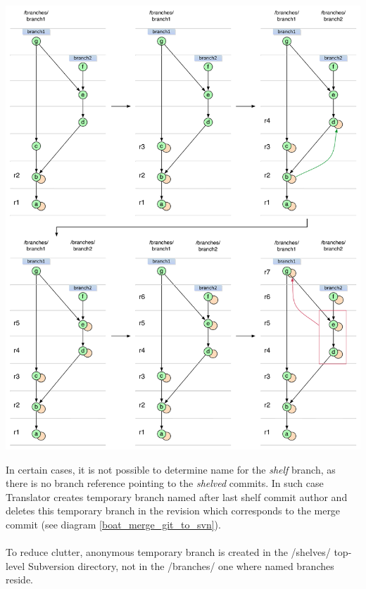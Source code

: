 \begin{center}
\includegraphics[width=\textwidth]{img/diagrams/boat_merge_shelve_is_normal_branch_git_to_svn.pdf}%
\label{boat_merge_shelve_is_normal_branch_git_to_svn}%
\end{center}

In certain cases, it is not possible to determine name for the \emph{shelf} branch, as there is no branch reference pointing to
the \emph{shelved} commits. In such case Translator creates temporary branch named after last shelf commit author and 
deletes this temporary branch in the revision which corresponds to the merge commit (see diagram \ref{boat_merge_git_to_svn}). 
\\\\
To reduce clutter, anonymous temporary branch is created in the /shelves/ top-level Subversion directory, not in the /branches/ one where named branches reside.

